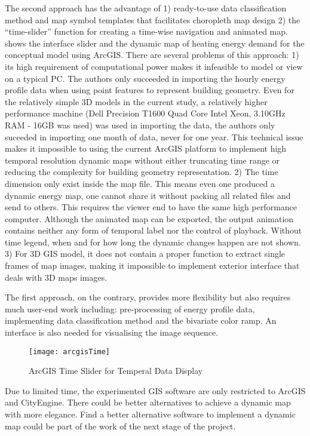 The second approach has the advantage of 1) ready-to-use data
classification method and map symbol templates that facilitates
choropleth map design 2) the ``time-slider'' function for creating a
time-wise navigation and animated map.  shows the
interface slider and the dynamic map of heating energy demand for the
conceptual model using ArcGIS. There are several problems of this
approach: 1) its high requirement of computational power makes it
infeasible to model or view on a typical PC. The authors only
succeeded in importing the hourly energy profile data when using point
features to represent building geometry. Even for the relatively
simple 3D models in the current study, a relatively higher performance
machine (Dell Precision T1600 Quad Core Intel Xeon, 3.10GHz RAM - 16GB
was used) was used in importing the data, the authors only suceeded in
importing one month of data, never for one year. This technical issue
makes it impossible to using the current ArcGIS platform to implement
high temporal resolution dynamic maps without either truncating time
range or reducing the complexity for building geometry
representation. 2) The time dimension only exist inside the map
file. This means even one produced a dynamic energy map, one cannot
share it without packing all related files and send to others. This
requires the viewer end to have the same high performance
computer. Although the animated map can be exported, the output
animation contains neither any form of temporal label nor the control
of playback. Without time legend, when and for how long the dynamic
changes happen are not shown. 3) For 3D GIS model, it does not contain
a proper function to extract single frames of map images, making it
impossible to implement exterior interface that deals with 3D maps
images.

The first approach, on the contrary, provides more flexibility but
also requires much user-end work including: pre-processing of energy
profile data, implementing data classification method and the
bivariate color ramp. An interface is also needed for visualising the
image sequence.

\begin{figure}[h!]
  \centering
  \texttt{[image: arcgisTime]}
  \caption{ArcGIS Time Slider for Temperal Data Display}
  \label{fig:arcgisTime}
\end{figure}

Due to limited time, the experimented GIS software are only restricted
to ArcGIS and CityEngine. There could be better alternatives to
achieve a dynamic map with more elegance. Find a better alternative
software to implement a dynamic map could be part of the work of the
next stage of the project.

